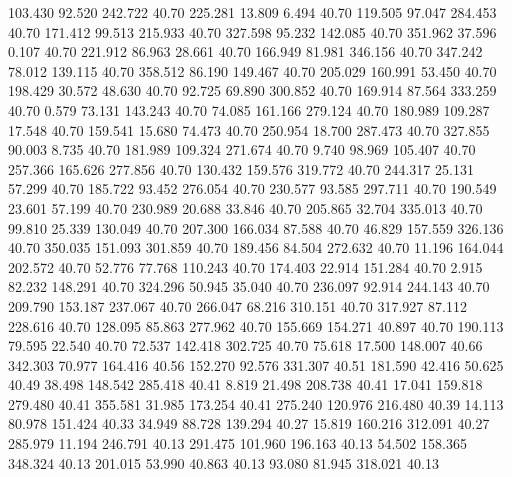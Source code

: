  103.430   92.520  242.722        40.70
 225.281   13.809    6.494        40.70
 119.505   97.047  284.453        40.70
 171.412   99.513  215.933        40.70
 327.598   95.232  142.085        40.70
 351.962   37.596    0.107        40.70
 221.912   86.963   28.661        40.70
 166.949   81.981  346.156        40.70
 347.242   78.012  139.115        40.70
 358.512   86.190  149.467        40.70
 205.029  160.991   53.450        40.70
 198.429   30.572   48.630        40.70
  92.725   69.890  300.852        40.70
 169.914   87.564  333.259        40.70
   0.579   73.131  143.243        40.70
  74.085  161.166  279.124        40.70
 180.989  109.287   17.548        40.70
 159.541   15.680   74.473        40.70
 250.954   18.700  287.473        40.70
 327.855   90.003    8.735        40.70
 181.989  109.324  271.674        40.70
   9.740   98.969  105.407        40.70
 257.366  165.626  277.856        40.70
 130.432  159.576  319.772        40.70
 244.317   25.131   57.299        40.70
 185.722   93.452  276.054        40.70
 230.577   93.585  297.711        40.70
 190.549   23.601   57.199        40.70
 230.989   20.688   33.846        40.70
 205.865   32.704  335.013        40.70
  99.810   25.339  130.049        40.70
 207.300  166.034   87.588        40.70
  46.829  157.559  326.136        40.70
 350.035  151.093  301.859        40.70
 189.456   84.504  272.632        40.70
  11.196  164.044  202.572        40.70
  52.776   77.768  110.243        40.70
 174.403   22.914  151.284        40.70
   2.915   82.232  148.291        40.70
 324.296   50.945   35.040        40.70
 236.097   92.914  244.143        40.70
 209.790  153.187  237.067        40.70
 266.047   68.216  310.151        40.70
 317.927   87.112  228.616        40.70
 128.095   85.863  277.962        40.70
 155.669  154.271   40.897        40.70
 190.113   79.595   22.540        40.70
  72.537  142.418  302.725        40.70
  75.618   17.500  148.007        40.66
 342.303   70.977  164.416        40.56
 152.270   92.576  331.307        40.51
 181.590   42.416   50.625        40.49
  38.498  148.542  285.418        40.41
   8.819   21.498  208.738        40.41
  17.041  159.818  279.480        40.41
 355.581   31.985  173.254        40.41
 275.240  120.976  216.480        40.39
  14.113   80.978  151.424        40.33
  34.949   88.728  139.294        40.27
  15.819  160.216  312.091        40.27
 285.979   11.194  246.791        40.13
 291.475  101.960  196.163        40.13
  54.502  158.365  348.324        40.13
 201.015   53.990   40.863        40.13
  93.080   81.945  318.021        40.13
